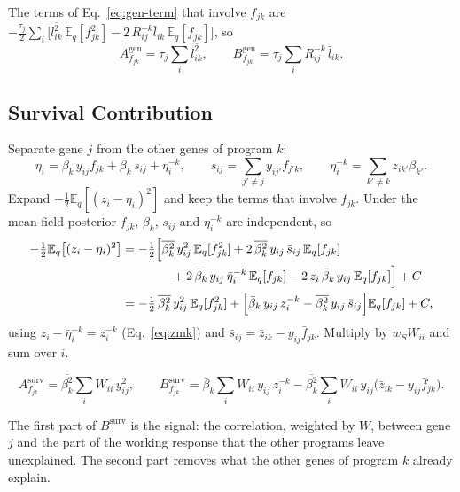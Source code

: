\documentclass[11pt]{article}
\newcommand{\lbar}[2]{\bar{l}_{#1#2}}
\newcommand{\fbar}[2]{\bar{f}_{#1#2}}
\newcommand{\zbar}[2]{\bar{z}_{#1#2}}
\newcommand{\betabar}[1]{\bar{\beta}_{#1}}
\newcommand{\lsec}[2]{\overline{l^2_{#1#2}}}
\newcommand{\betasec}[1]{\overline{\beta^2_{#1}}}
\newcommand{\E}{\mathbb{E}_q}
\newcommand{\ws}{w_S}
\begin{document}
The terms of Eq.~\eqref{eq:gen-term} that involve $f_{jk}$ are
$-\tfrac{\tau_j}{2}\sum_i\bigl[\lsec{i}{k}\,\E[f_{jk}^2] - 2\,R^{-k}_{ij}\lbar{i}{k}\,\E[f_{jk}]\bigr]$,
so
\begin{equation}\label{eq:AB-F-gen}
  A^{\text{gen}}_{f_{jk}} = \tau_j\sum_i\lsec{i}{k}, \qquad
  B^{\text{gen}}_{f_{jk}} = \tau_j\sum_i R^{-k}_{ij}\,\lbar{i}{k}.
\end{equation}

\subsection{Survival Contribution}

\begin{derivbox}
Separate gene $j$ from the other genes of program $k$:
\[
  \eta_i = \beta_k\,y_{ij}f_{jk} + \beta_k\,s_{ij} + \eta^{-k}_i,
  \qquad
  s_{ij} = \sum_{j'\ne j} y_{ij'}f_{j'k},
  \qquad
  \eta^{-k}_i = \sum_{k'\ne k} z_{ik'}\beta_{k'} .
\]
Expand $-\tfrac12\E[(z_i-\eta_i)^2]$ and keep the terms that involve $f_{jk}$.
Under the mean-field posterior $f_{jk}$, $\beta_k$, $s_{ij}$ and $\eta^{-k}_i$ are
independent, so
\begin{align*}
  -\tfrac12\E\bigl[(z_i-\eta_i)^2\bigr]
  &= -\tfrac12\Bigl[\betasec{k}\,y_{ij}^2\,\E[f_{jk}^2]
     + 2\,\betasec{k}\,y_{ij}\,\bar s_{ij}\,\E[f_{jk}]\\
  &\qquad\qquad + 2\,\betabar{k}\,y_{ij}\,\bar\eta^{-k}_i\,\E[f_{jk}]
     - 2\,z_i\,\betabar{k}\,y_{ij}\,\E[f_{jk}]\Bigr] + C\\
  &= -\tfrac12\,\betasec{k}\,y_{ij}^2\,\E[f_{jk}^2]
     + \Bigl[\betabar{k}\,y_{ij}\,z^{-k}_i
     - \betasec{k}\,y_{ij}\,\bar s_{ij}\Bigr]\E[f_{jk}] + C,
\end{align*}
using $z_i - \bar\eta^{-k}_i = z^{-k}_i$ (Eq.~\ref{eq:zmk}) and
$\bar s_{ij} = \zbar{i}{k} - y_{ij}\fbar{j}{k}$. Multiply by $\ws W_{ii}$ and sum
over $i$.
\end{derivbox}

\begin{equation}\label{eq:AB-F-surv}
  A^{\text{surv}}_{f_{jk}} = \betasec{k}\sum_i W_{ii}\,y_{ij}^2, \qquad
  B^{\text{surv}}_{f_{jk}} = \betabar{k}\sum_i W_{ii}\,y_{ij}\,z^{-k}_i
   - \betasec{k}\sum_i W_{ii}\,y_{ij}\bigl(\zbar{i}{k} - y_{ij}\fbar{j}{k}\bigr).
\end{equation}

The first part of $B^{\text{surv}}$ is the signal: the correlation, weighted by
$W$, between gene $j$ and the part of the working response that the other
programs leave unexplained. The second part removes what the other genes of
program $k$ already explain.
\end{document}
